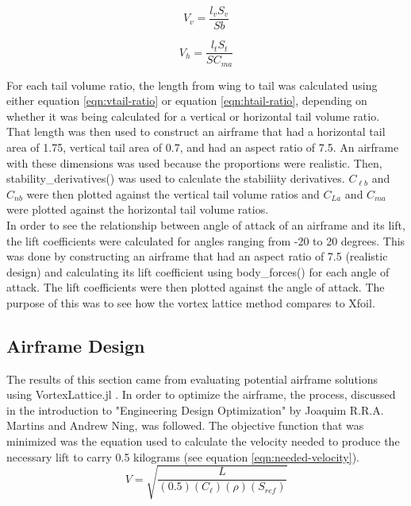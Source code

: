 \documentclass[journal]{new-aiaa}
\begin{document}
	\begin{equation}
		V_v = \frac{l_vS_v}{Sb}
		\label{eqn:vtail-ratio}
	\end{equation}
	
	\begin{equation}
		V_h = \frac{l_tS_t}{SC_{ma}}
		\label{eqn:htail-ratio}
	\end{equation}

	For each tail volume ratio, the length from wing to tail was calculated using either equation \ref{eqn:vtail-ratio} or equation \ref{eqn:htail-ratio}, depending on whether it was being calculated for a vertical or horizontal tail volume ratio. That length was then used to construct an airframe that had a horizontal tail area of 1.75, vertical tail area of 0.7, and had an aspect ratio of 7.5. An airframe with these dimensions was used because the proportions were realistic. Then, stability\_derivatives() was used to calculate the stabiliity derivatives. \(C_{\ell{b}}\) and \(C_{nb}\) were then plotted against the vertical tail volume ratios and \(C_{La}\) and \(C_{ma}\) were plotted against the horizontal tail volume ratios.\\
	
	In order to see the relationship between angle of attack of an airframe and its lift, the lift coefficients were calculated for angles ranging from -20 to 20 degrees. This was done by constructing an airframe that had an aspect ratio of 7.5 (realistic design) and calculating its lift coefficient using body\_forces() for each angle of attack. The lift coefficients were then plotted against the angle of attack. The purpose of this was to see how the vortex lattice method compares to Xfoil.\\
	
	\subsection{Airframe Design}
	The results of this section came from evaluating potential airframe solutions using VortexLattice.jl \cite{McDonnell-Ning}. In order to optimize the airframe, the process, discussed in the introduction to "Engineering Design Optimization" by Joaquim R.R.A. Martins and Andrew Ning, was followed. The objective function  that was minimized was the equation used to calculate the velocity needed to produce the necessary lift to carry 0.5 kilograms (see equation \ref{eqn:needed-velocity}).\\
	
	\begin{equation}
		V = \sqrt{\frac{L}{(0.5)(C_{\ell})(\rho)(S_{ref})}}
		\label{eqn:needed-velocity}
	\end{equation}
	
\end{document}
